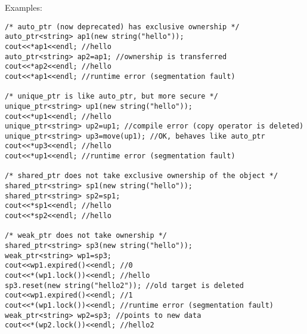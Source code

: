 \documentclass[12pt,a4paper]{article}
\begin{document}
Examples:
\vspace{10pt}
\lstset{style=CPP_CODE}
\begin{lstlisting}
/* auto_ptr (now deprecated) has exclusive ownership */
auto_ptr<string> ap1(new string("hello"));
cout<<*ap1<<endl; //hello
auto_ptr<string> ap2=ap1; //ownership is transferred
cout<<*ap2<<endl; //hello
cout<<*ap1<<endl; //runtime error (segmentation fault)

/* unique_ptr is like auto_ptr, but more secure */
unique_ptr<string> up1(new string("hello"));
cout<<*up1<<endl; //hello
unique_ptr<string> up2=up1; //compile error (copy operator is deleted)
unique_ptr<string> up3=move(up1); //OK, behaves like auto_ptr
cout<<*up3<<endl; //hello
cout<<*up1<<endl; //runtime error (segmentation fault)

/* shared_ptr does not take exclusive ownership of the object */
shared_ptr<string> sp1(new string("hello"));
shared_ptr<string> sp2=sp1;
cout<<*sp1<<endl; //hello
cout<<*sp2<<endl; //hello

/* weak_ptr does not take ownership */
shared_ptr<string> sp3(new string("hello"));
weak_ptr<string> wp1=sp3;
cout<<wp1.expired()<<endl; //0
cout<<*(wp1.lock())<<endl; //hello
sp3.reset(new string("hello2")); //old target is deleted
cout<<wp1.expired()<<endl; //1
cout<<*(wp1.lock())<<endl; //runtime error (segmentation fault)
weak_ptr<string> wp2=sp3; //points to new data
cout<<*(wp2.lock())<<endl; //hello2
\end{lstlisting}
\end{document}
